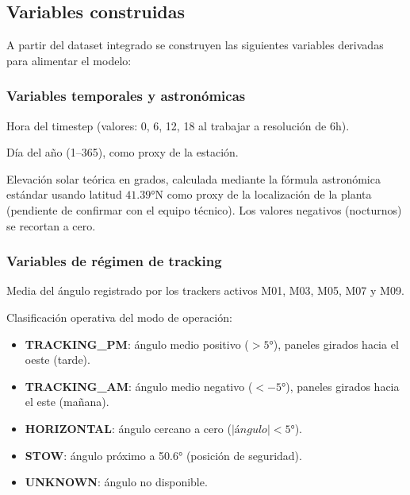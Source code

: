 \documentclass[12pt,a4paper]{article}
\begin{document}
\subsection{Variables construidas}

A partir del dataset integrado se construyen las siguientes variables derivadas para
alimentar el modelo:

\subsubsection{Variables temporales y astronómicas}

\begin{description}[noitemsep, style=nextline]
    \item[\texttt{hour\_of\_day}] Hora del timestep (valores: 0, 6, 12, 18 al trabajar
        a resolución de 6h).
    \item[\texttt{day\_of\_year}] Día del año (1--365), como proxy de la estación.
    \item[\texttt{solar\_elevation\_deg}] Elevación solar teórica en grados, calculada
        mediante la fórmula astronómica estándar usando latitud $41.39°$N como proxy
        de la localización de la planta (pendiente de confirmar con el equipo técnico).
        Los valores negativos (nocturnos) se recortan a cero.
\end{description}

\subsubsection{Variables de régimen de tracking}

\begin{description}[noitemsep, style=nextline]
    \item[\texttt{track\_mean}] Media del ángulo registrado por los trackers activos
        M01, M03, M05, M07 y M09.
    \item[\texttt{tracking\_regime}] Clasificación operativa del modo de operación:
        \begin{itemize}[noitemsep]
            \item \textbf{TRACKING\_PM}: ángulo medio positivo ($> 5°$), paneles
                girados hacia el oeste (tarde).
            \item \textbf{TRACKING\_AM}: ángulo medio negativo ($< -5°$), paneles
                girados hacia el este (mañana).
            \item \textbf{HORIZONTAL}: ángulo cercano a cero ($|ángulo| < 5°$).
            \item \textbf{STOW}: ángulo próximo a 50.6° (posición de seguridad).
            \item \textbf{UNKNOWN}: ángulo no disponible.
        \end{itemize}
\end{description}
\end{document}
